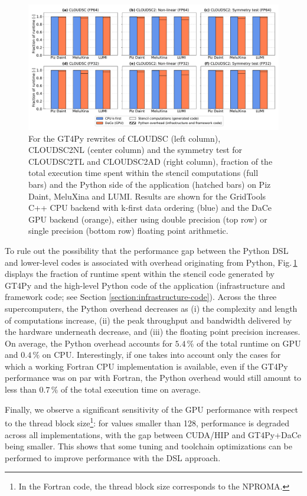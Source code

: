 \documentclass[gmd,manuscript,online]{copernicus}
\theoremstyle{theorem}
\theoremstyle{definition}
\theoremstyle{remark}
\theoremstyle{proposition}
\begin{document}
	\begin{figure}[t!]
		\centering
		\includegraphics[scale=0.44]{runtime_fraction_1.pdf}
		\caption{For the GT4Py rewrites of CLOUDSC (left column), CLOUDSC2NL (center column) and the symmetry test for CLOUDSC2TL and CLOUDSC2AD (right column), fraction of the total execution time spent within the stencil computations (full bars) and the Python side of the application (hatched bars) on Piz Daint, MeluXina and LUMI. Results are shown for the GridTools C++ CPU backend with k-first data ordering (blue) and the DaCe GPU backend (orange), either using double precision (top row) or single precision (bottom row) floating point arithmetic.}
		\label{fig:runtime-fraction}
	\end{figure}

	To rule out the possibility that the performance gap between the Python DSL and lower-level codes is associated with overhead originating from Python, Fig.\,\ref{fig:runtime-fraction} displays the fraction of runtime spent within the stencil code generated by GT4Py and the high-level Python code of the application (infrastructure and framework code; see Section \ref{section:infrastructure-code}). Across the three supercomputers, the Python overhead decreases as (i) the complexity and length of computations increase, (ii) the peak throughput and bandwidth delivered by the hardware underneath decrease, and (iii) the floating point precision increases. On average, the Python overhead accounts for $5.4\,\%$ of the total runtime on GPU and $0.4\,\%$ on CPU. Interestingly, if one takes into account only the cases for which a working Fortran CPU implementation is available, even if the GT4Py performance was on par with Fortran, the Python overhead would still amount to less than $0.7\,\%$ of the total execution time on average.

	Finally, we observe a significant sensitivity of the GPU performance with respect to the thread block size\footnote{In the Fortran code, the thread block size corresponds to the NPROMA.}: for values smaller than 128, performance is degraded across all implementations, with the gap between CUDA/HIP and GT4Py+DaCe being smaller. This shows that some tuning and toolchain optimizations can be performed to improve performance with the DSL approach.
\end{document}
